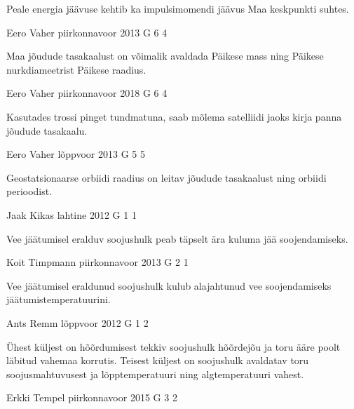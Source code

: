\documentclass[11pt]{article}
\begin{document}
{{\ifHint
Peale energia jäävuse kehtib ka impulsimomendi jäävus Maa keskpunkti suhtes.
\fi
}

{Eero Vaher} %
{piirkonnavoor} %
{2013} %
{G 6} %
{4} %
{

\ifHint
Maa jõudude tasakaalust on võimalik avaldada Päikese mass ning Päikese nurkdiameetrist Päikese raadius.
\fi
}

{Eero Vaher} %
{piirkonnavoor} %
{2018} %
{G 6} %
{4} %
{

\ifHint
Kasutades trossi pinget tundmatuna, saab mõlema satelliidi jaoks kirja panna jõudude tasakaalu.
\fi
}

{Eero Vaher} %
{lõppvoor} %
{2013} %
{G 5} %
{5} %
{

\ifHint
Geostatsionaarse orbiidi raadius on leitav jõudude tasakaalust ning orbiidi perioodist.
\fi
}

{Jaak Kikas} %
{lahtine} %
{2012} %
{G 1} %
{1} %
{

\ifHint
Vee jäätumisel eralduv soojushulk peab täpselt ära kuluma jää soojendamiseks.
\fi
}

{Koit Timpmann} %
{piirkonnavoor} %
{2013} %
{G 2} %
{1} %
{

\ifHint
Vee jäätumisel eraldunud soojushulk kulub alajahtunud vee soojendamiseks jäätumistemperatuurini.
\fi
}

{Ants Remm} %
{lõppvoor} %
{2012} %
{G 1} %
{2} %
{

\ifHint
Ühest küljest on hõõrdumisest tekkiv soojushulk hõõrdejõu ja toru ääre poolt läbitud vahemaa korrutis. Teisest küljest on soojushulk avaldatav toru soojusmahtuvusest ja lõpptemperatuuri ning algtemperatuuri vahest.
\fi
}

{Erkki Tempel} %
{piirkonnavoor} %
{2015} %
{G 3} %
{2} %
{

}}
\end{document}
